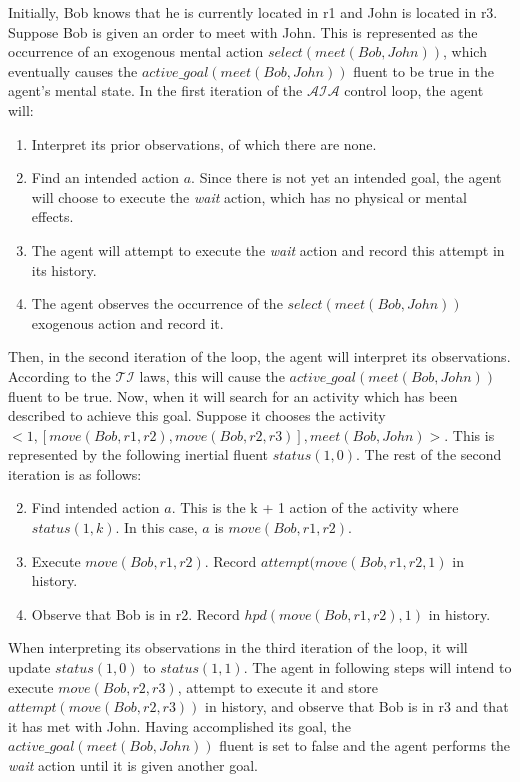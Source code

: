 Initially, Bob knows that he is currently located in r1 and John is located in r3.
Suppose Bob is given an order to meet with John.
This is represented as the occurrence of an exogenous mental action $select(meet(Bob, John))$, which eventually causes the $active\_goal(meet(Bob, John))$ fluent to be true in the agent's mental state.
In the first iteration of the $\mathcal{AIA}$ control loop, the agent will:

\begin{enumerate}
    \item Interpret its prior observations, of which there are none.
    \item Find an intended action $a$.
        Since there is not yet an intended goal, the agent will choose to execute the \textit{wait} action, which has no physical or mental effects.
    \item The agent will attempt to execute the \textit{wait} action and record this attempt in its history.
    \item The agent observes the occurrence of the $select(meet(Bob, John))$ exogenous action and record it.
\end{enumerate}

Then, in the second iteration of the loop, the agent will interpret its observations.
According to the $\mathcal{TI}$ laws, this will cause the $active\_goal(meet(Bob, John))$ fluent to be true.
Now, when it will search for an activity which has been described to achieve this goal.
Suppose it chooses the activity $<1, [move(Bob, r1,r2), move(Bob, r2, r3)],meet(Bob,John)>$.
This is represented by the following inertial fluent $status(1,0)$.
The rest of the second iteration is as follows:

\begin{enumerate}
    \setcounter{enumi}{1}
    \item Find intended action $a$.
        This is the k + 1 action of the activity where $status(1, k)$.
        In this case, $a$ is $move(Bob, r1, r2)$.
    \item Execute $move(Bob, r1, r2)$.
        Record $attempt(move(Bob, r1, r2, 1)$ in history.
    \item Observe that Bob is in r2.
        Record $hpd(move(Bob, r1, r2),1)$ in history.
\end{enumerate}

When interpreting its observations in the third iteration of the loop, it will update $status(1,0)$ to $status(1,1)$.
The agent in following steps will intend to execute $move(Bob, r2, r3)$, attempt to execute it and store $attempt(move(Bob, r2, r3))$ in history, and observe that Bob is in r3 and that it has met with John.
Having accomplished its goal, the $active\_goal(meet(Bob, John))$ fluent is set to false and the agent performs the \textit{wait} action until it is given another goal.

